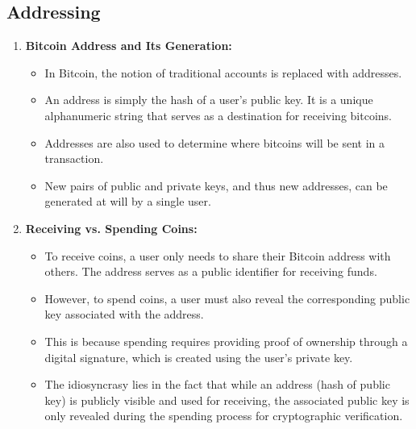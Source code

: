 \documentclass{report}
\begin{document}
\subsection{Addressing}
\begin{enumerate}
	\item \textbf{Bitcoin Address and Its Generation:}
	\begin{itemize}
		\item In Bitcoin, the notion of traditional accounts is replaced with addresses.
		\item An address is simply the hash of a user's public key. It is a unique alphanumeric string that serves as a destination for receiving bitcoins.
		\item Addresses are also used to determine where bitcoins will be sent in a transaction.
		\item New pairs of public and private keys, and thus new addresses, can be generated at will by a single user.
	\end{itemize}
	\item \textbf{Receiving vs. Spending Coins:}
	\begin{itemize}
	\item To receive coins, a user only needs to share their Bitcoin address with others. The address serves as a public identifier for receiving funds.
	\item However, to spend coins, a user must also reveal the corresponding public key associated with the address.
	\item This is because spending requires providing proof of ownership through a digital signature, which is created using the user's private key.
	\item The idiosyncrasy lies in the fact that while an address (hash of public key) is publicly visible and used for receiving, the associated public key is only revealed during the spending process for cryptographic verification.
	\end{itemize}
\end{enumerate}
\end{document}
